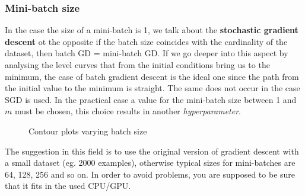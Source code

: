 \subsubsection{Mini-batch size}
In the case the size of a mini-batch is 1, we talk about the \textbf{stochastic gradient descent} ot the opposite if the batch size coincides with the cardinality of the dataset, then batch GD = mini-batch GD. If we go deeper into this aspect by analysing the level curves that from the initial conditions bring us to the minimum, the case of batch gradient descent is the ideal one since the path from the initial value to the minimum is straight. The same does not occur in the case SGD is used. In the practical case a value for the mini-batch size between 1 and $m$ must be chosen, this choice results in another \textit{hyperparameter}.

\begin{figure}[h]
    \centering
     \quad 
    \caption{Contour plots varying batch size}
\end{figure}

The suggestion in this field is to use the original version of gradient descent with a small dataset (eg. 2000 examples), otherwise typical sizes for mini-batches are 64, 128, 256 and so on. In order to avoid problems, you are supposed to be sure that it fits in the used CPU/GPU.

